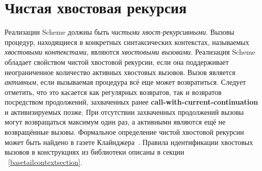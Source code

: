 \section{Чистая хвостовая рекурсия}\vspace{-2.2mm}
\label{proper tail recursion}

Реализации Scheme должны быть {\em чистыми хвост-рекурсивными}. Вызовы процедур, находящиеся в конкретных синтаксических контекстах, называемых
\textit{хвостовыми контекстами}, являются \textit{хвостовыми
  вызовами}. Реализация Scheme обладает свойством чистой хвостовой
рекурсии, если она поддерживает неограниченное количество активных хвостовых вызовов. Вызов
является {\em активным}, если вызываемая процедура всё еще может возвратиться. Следует отметить,
что это касается как регулярных возвратов, так и возвратов посредством продолжений, захваченных
ранее {\bfseries\cf call-with-current-continuation} и активизируемых позже. При отсутствии
захваченных продолжений вызовы могут возвращаться максимум один раз, а активными являются ещё не
возвращённые вызовы. Формальное определение чистой хвостовой рекурсии может быть найдено в
газете Клайнджера~\cite{propertailrecursion}. Правила идентификации хвостовых вызовов в
конструкциях из библиотеки \textbf{} описаны в секции
~\ref{basetailcontextsection}.\vspace{-2.2mm}

